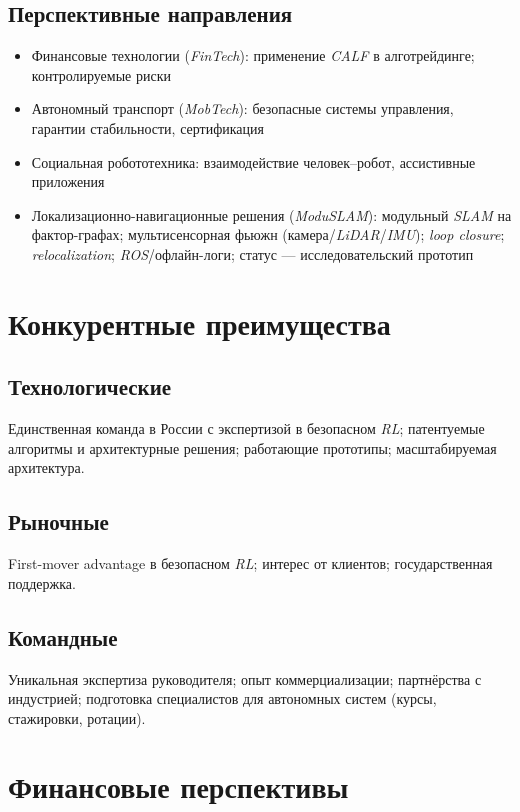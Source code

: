 \documentclass[12pt,a4paper]{article}
\begin{document}
\subsection*{Перспективные направления}
\begin{itemize}
    \item Финансовые технологии (\textit{FinTech}): применение \textit{CALF} в алготрейдинге; контролируемые риски
    \item Автономный транспорт (\textit{MobTech}): безопасные системы управления, гарантии стабильности, сертификация
    \item Социальная робототехника: взаимодействие человек–робот, ассистивные приложения
    \item Локализационно-навигационные решения (\textit{ModuSLAM}): модульный \textit{SLAM} на фактор-графах; мультисенсорная фьюжн (камера/\textit{LiDAR}/\textit{IMU}); \textit{loop closure}; \textit{relocalization}; \textit{ROS}/офлайн-логи; статус --- исследовательский прототип
\end{itemize}

\section{Конкурентные преимущества}
\subsection*{Технологические}
Единственная команда в России с экспертизой в безопасном \textit{RL}; патентуемые алгоритмы и архитектурные решения; работающие прототипы; масштабируемая архитектура.

\subsection*{Рыночные}
First-mover advantage в безопасном \textit{RL}; интерес от клиентов; государственная поддержка.

\subsection*{Командные}
Уникальная экспертиза руководителя; опыт коммерциализации; партнёрства с индустрией; подготовка специалистов для автономных систем (курсы, стажировки, ротации).

\section{Финансовые перспективы}
\end{document}
